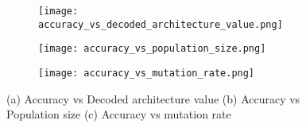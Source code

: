 \documentclass[final]{cvpr}
\begin{document}
\begin{figure*}[t]
  \centering
\begin{subfigure}{0.3\linewidth}
\texttt{[image: accuracy\_vs\_decoded\_architecture\_value.png]}
    \caption{}
    \label{subfig:AccVsArch}
  \end{subfigure}
  \quad
  \begin{subfigure}{0.3\linewidth}
\texttt{[image: accuracy\_vs\_population\_size.png]}
    \caption{}
    \label{subfig:AccVsPop}
  \end{subfigure}
  \quad
  \begin{subfigure}{0.3\linewidth}
\texttt{[image: accuracy\_vs\_mutation\_rate.png]}
    \caption{}
    \label{subfig:AccVsMrate}
  \end{subfigure}
  
  \caption{(a) Accuracy vs Decoded architecture value
           (b) Accuracy vs Population size
           (c) Accuracy vs mutation rate}
  \label{fig:exp}
  \end{figure*}
\end{document}
